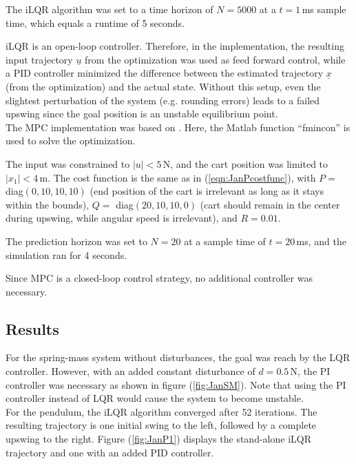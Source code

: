 \documentclass[letterpaper, 10 pt, conference]{ieeeconf}  %
\begin{document}
The iLQR algorithm was set to a time horizon of $N=5000$ at a $t=1$\,ms sample time, which equals a runtime of 5 seconds.

iLQR is an open-loop controller. Therefore, in the implementation, the resulting input trajectory $\underline{u}$ from the optimization was used as feed forward control, while a PID controller minimized the difference between the estimated trajectory $\underline{x}$ (from the optimization) and the actual state.
Without this setup, even the slightest perturbation of the system (e.g. rounding errors) leads to a failed upswing since the goal position is an unstable equilibrium point.\\

The MPC implementation was based on \cite{Opti_MPC}. Here, the Matlab function ``fmincon'' is used to solve the optimization.

The input was constrained to $|u|<5$\,N, and the cart position was limited to $|x_1|<4$\,m. The cost function is the same as in (\ref{eqn:JanPcostfunc}), with $P=$ diag$(0,10,10,10)$ (end position of the cart is irrelevant as long as it stays within the bounds), $Q=$ diag$(20,10,10,0)$ (cart should remain in the center during upswing, while angular speed is irrelevant), and $R=0.01$. 

The prediction horizon was set to $N=20$ at a sample time of $t=20$\,ms, and the simulation ran for 4 seconds.

Since MPC is a closed-loop control strategy, no additional controller was necessary.
\subsection{Results}


For the spring-mass system without disturbances, the goal was reach by the LQR controller. However, with an added constant disturbance of $d=0.5$\,N, the PI controller was necessary as shown in figure (\ref{fig:JanSM}). Note that using the PI controller instead of LQR would cause the system to become unstable.\\

For the pendulum, the iLQR algorithm converged after 52 iterations. The resulting trajectory is one initial swing to the left, followed by a complete upswing to the right. Figure (\ref{fig:JanP1}) displays the stand-alone iLQR trajectory and one with an added PID controller.
\end{document}
